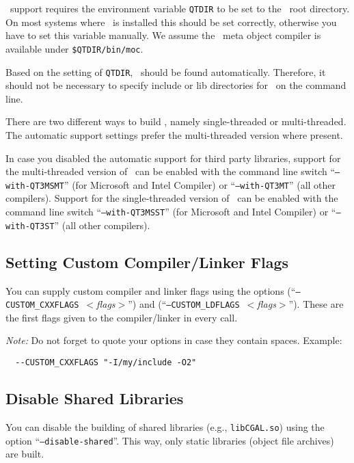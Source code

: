 \qt\ support requires the environment variable \texttt{QTDIR} to be
set to the \qt\ root directory. On most systems where \qt\ is
installed this should be set correctly, otherwise you have to set this
variable manually. We assume the \qt\ meta object compiler is
available under \texttt{\${QTDIR}/bin/moc}.

Based on the setting of \texttt{QTDIR}, \qt\ should be found
automatically. Therefore, it should not be necessary to specify
include or lib directories for \qt\ on the command line.

There are two different ways to build \qt, namely single-threaded or
multi-threaded. The automatic support settings prefer the
multi-threaded version where present.

In case you disabled the automatic support for third party libraries,
support for the multi-threaded version of \qt\ can be enabled with the
command line switch ``\texttt{--with-QT3MSMT}'' (for Microsoft and
Intel Compiler) or ``\texttt{--with-QT3MT}'' (all other compilers).
Support for the single-threaded version of \qt\ can be enabled with
the command line switch ``\texttt{--with-QT3MSST}'' (for Microsoft and
Intel Compiler) or ``\texttt{--with-QT3ST}'' (all other compilers).

\subsection{Setting Custom Compiler/Linker Flags\label{sec:custom-setup}}

You can supply custom compiler and linker flags using the options
\mbox{(``\texttt{--CUSTOM\_CXXFLAGS}
  \textit{$<$flags$>$}'')} and
\mbox{(``\texttt{--CUSTOM\_LDFLAGS}
  \textit{$<$flags$>$}'')}. These are the
first flags given to the compiler/linker in every call.

\textit{Note:} Do not forget to quote your options in case they
contain spaces. Example:
\begin{verbatim}
  --CUSTOM_CXXFLAGS "-I/my/include -O2"
\end{verbatim}


\subsection{Disable Shared Libraries\label{sec:disable-shared-setup}}

You can disable the building of shared libraries (e.g.,
\texttt{libCGAL.so}) using the option
\mbox{``\texttt{--disable-shared}''}. This
way, only static libraries (object file archives) are built.

